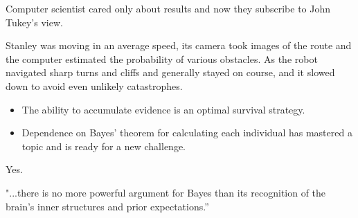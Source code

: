 \documentclass[12pt]{article}
\begin{document}

\begin{enumerate}

\begin{flushleft}
    Computer scientist cared only about results and now they subscribe to John Tukey's view.
\end{flushleft}

\begin{flushleft}
    Stanley was moving in an average speed, its camera took images of the route and the computer estimated the probability of various obstacles. 
    As the robot navigated sharp turns and cliffs and generally stayed on course, and it slowed down to avoid even unlikely catastrophes.
\end{flushleft}

\begin{itemize}
    \item The ability to accumulate evidence is an optimal survival strategy.
    \item Dependence on Bayes’ theorem for calculating each individual has mastered a topic and is ready for a new challenge.
\end{itemize}

\begin{flushleft}
    Yes.
\end{flushleft}

\begin{flushleft}
    "...there is no more powerful argument for Bayes than its recognition of the brain’s inner structures and prior expectations.”
\end{flushleft}

\end{enumerate}




\end{document}

